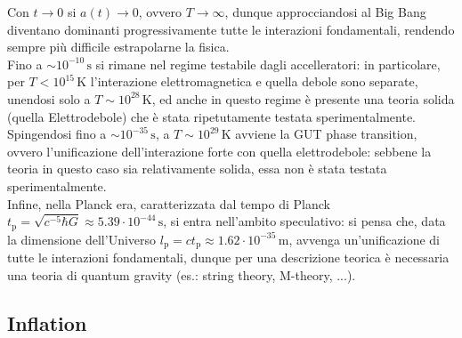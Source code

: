 Con $ t \rightarrow 0 $ si $ a(t) \rightarrow 0 $, ovvero $ T \rightarrow \infty $, dunque approcciandosi al Big Bang diventano dominanti progressivamente tutte le interazioni fondamentali, rendendo sempre più difficile estrapolarne la fisica.\\
Fino a $ \sim 10^{-10} \,\text{s} $ si rimane nel regime testabile dagli accelleratori: in particolare, per $ T < 10^{15} \,\text{K} $ l'interazione elettromagnetica e quella debole sono separate, unendosi solo a $ T \sim 10^{28} \,\text{K} $, ed anche in questo regime è presente una teoria solida (quella Elettrodebole) che è stata ripetutamente testata sperimentalmente.\\
Spingendosi fino a $ \sim 10^{-35} \,\text{s} $, a $ T \sim 10^{29} \,\text{K} $ avviene la GUT phase transition, ovvero l'unificazione dell'interazione forte con quella elettrodebole: sebbene la teoria in questo caso sia relativamente solida, essa non è stata testata sperimentalmente.\\
Infine, nella Planck era, caratterizzata dal tempo di Planck $ t_\text{p} = \sqrt{c^{-5} \hbar G} \approx 5.39 \cdot 10^{-44} \,\text{s} $, si entra nell'ambito speculativo: si pensa che, data la dimensione dell'Universo $ l_\text{p} = c t_\text{p} \approx 1.62 \cdot 10^{-35} \,\text{m} $, avvenga un'unificazione di tutte le interazioni fondamentali, dunque per una descrizione teorica è necessaria una teoria di quantum gravity (es.: string theory, M-theory, ...).

\subsection{Inflation}


